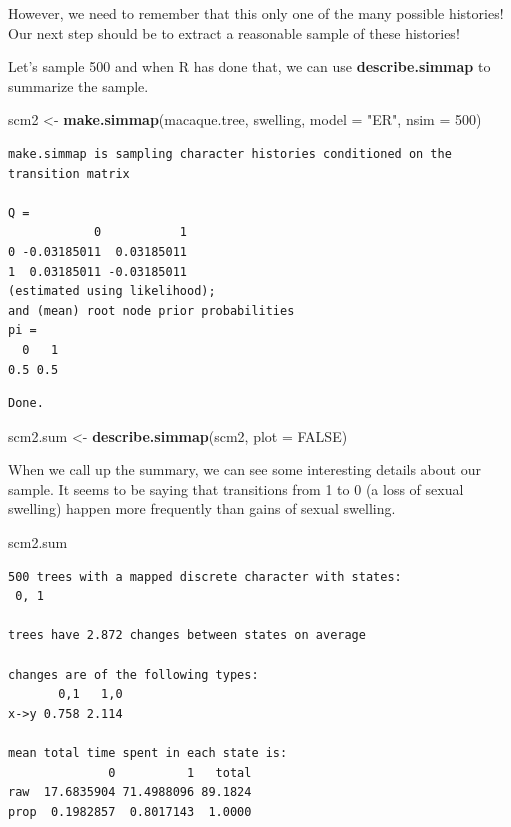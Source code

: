 \documentclass[
]{book}
\newenvironment{Shaded}{\begin{snugshade}}{\end{snugshade}}
\newcommand{\DataTypeTok}[1]{\textcolor[rgb]{0.13,0.29,0.53}{#1}}
\newcommand{\DecValTok}[1]{\textcolor[rgb]{0.00,0.00,0.81}{#1}}
\newcommand{\KeywordTok}[1]{\textcolor[rgb]{0.13,0.29,0.53}{\textbf{#1}}}
\newcommand{\NormalTok}[1]{#1}
\newcommand{\OtherTok}[1]{\textcolor[rgb]{0.56,0.35,0.01}{#1}}
\newcommand{\StringTok}[1]{\textcolor[rgb]{0.31,0.60,0.02}{#1}}
\begin{document}
However, we need to remember that this only one of the many possible histories! Our next step should be to extract a reasonable sample of these histories!

Let's sample 500 and when R has done that, we can use \textbf{describe.simmap} to summarize the sample.

\begin{Shaded}
\begin{Highlighting}[]
\NormalTok{scm2 \textless{}{-}}\StringTok{ }\KeywordTok{make.simmap}\NormalTok{(macaque.tree, swelling, }\DataTypeTok{model =} \StringTok{"ER"}\NormalTok{, }\DataTypeTok{nsim =} \DecValTok{500}\NormalTok{)}
\end{Highlighting}
\end{Shaded}

\begin{verbatim}
make.simmap is sampling character histories conditioned on the transition matrix

Q =
            0           1
0 -0.03185011  0.03185011
1  0.03185011 -0.03185011
(estimated using likelihood);
and (mean) root node prior probabilities
pi =
  0   1 
0.5 0.5 
\end{verbatim}

\begin{verbatim}
Done.
\end{verbatim}

\begin{Shaded}
\begin{Highlighting}[]
\NormalTok{scm2.sum \textless{}{-}}\StringTok{ }\KeywordTok{describe.simmap}\NormalTok{(scm2, }\DataTypeTok{plot =} \OtherTok{FALSE}\NormalTok{)}
\end{Highlighting}
\end{Shaded}

When we call up the summary, we can see some interesting details about our sample. It seems to be saying that transitions from 1 to 0 (a loss of sexual swelling) happen more frequently than gains of sexual swelling.

\begin{Shaded}
\begin{Highlighting}[]
\NormalTok{scm2.sum}
\end{Highlighting}
\end{Shaded}

\begin{verbatim}
500 trees with a mapped discrete character with states:
 0, 1 

trees have 2.872 changes between states on average

changes are of the following types:
       0,1   1,0
x->y 0.758 2.114

mean total time spent in each state is:
              0          1   total
raw  17.6835904 71.4988096 89.1824
prop  0.1982857  0.8017143  1.0000
\end{verbatim}
\end{document}
